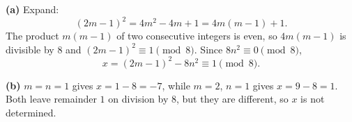\textbf{(a)} Expand:
\[(2m-1)^2=4m^2-4m+1=4m(m-1)+1.\]
The product $m(m-1)$ of two consecutive integers is even, so $4m(m-1)$ is divisible by $8$ and $(2m-1)^2\equiv1\pmod8$. Since $8n^2\equiv0\pmod8$,
\[x=(2m-1)^2-8n^2\equiv\boxed{1}\pmod8.\]

\textbf{(b)} $m=n=1$ gives $x=1-8=-7$, while $m=2$, $n=1$ gives $x=9-8=1$. Both leave remainder $1$ on division by $8$, but they are different, so $x$ is not determined.
